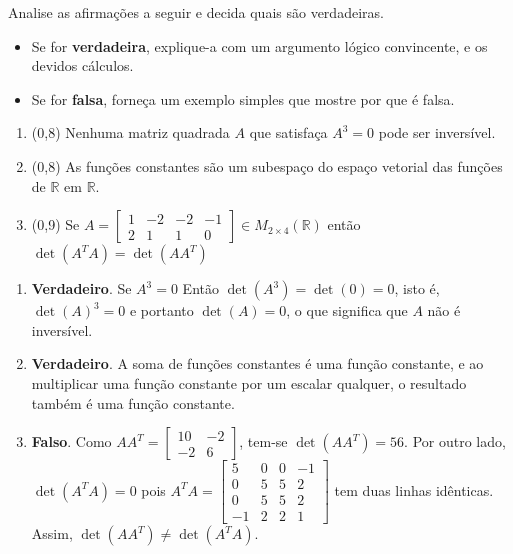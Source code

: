 \documentclass[12pt,a4paper]{article}
\newcommand*\R{\mathbb{R}}
\begin{document}
\begin{ExerciseList}
\Exercise[title={2,5}]
Analise as afirmações a seguir e decida quais são verdadeiras.
\begin{itemize}
\item Se for \textbf{verdadeira}, explique-a com um argumento lógico convincente, e os devidos cálculos.
\item Se for \textbf{falsa}, forneça um exemplo simples que mostre por que é falsa.
\end{itemize}
\begin{enumerate}
\item (0,8) Nenhuma matriz quadrada $A$ que satisfaça $A^{3} = 0$ pode ser inversível.
\item (0,8) As funções constantes são um subespaço do espaço vetorial das funções de $\R$ em $\R$.
\item (0,9) Se $A = \begin{bmatrix}
1 & -2  & -2 & -1\\
2 &  1  &  1 & 0
\end{bmatrix} \in M_{2 \times 4}(\R)$ então $\det(A^T A) = \det(A A^T)$
\end{enumerate}
\Answer
\begin{enumerate}
\item \textbf{Verdadeiro}. Se $A^3 = 0$ Então $\det(A^3) = \det( 0 ) = 0$, isto é, $ \det(A)^3 = 0$ e portanto $\det(A) = 0$, o que significa que $A$ não é inversível.
\item \textbf{Verdadeiro}. A soma de funções constantes é uma função constante, e ao multiplicar uma função constante por um escalar qualquer, o resultado também é uma função constante.
\item \textbf{Falso}. Como $A A^T =  \begin{bmatrix}
10 & -2\\
-2 & 6
\end{bmatrix}$, tem-se $\det(AA^T) = 56$. Por outro lado, $\det(A^TA) = 0$ pois $A^T A =  \begin{bmatrix}
 5 & 0 & 0 & -1\\
 0 & 5 & 5 &  2 \\
 0 & 5 & 5 &  2 \\
-1 & 2 & 2 &  1
\end{bmatrix}$ tem duas linhas idênticas. Assim, $\det(AA^T) \neq \det(A^TA)$.
\end{enumerate}


\end{ExerciseList}
\end{document}
